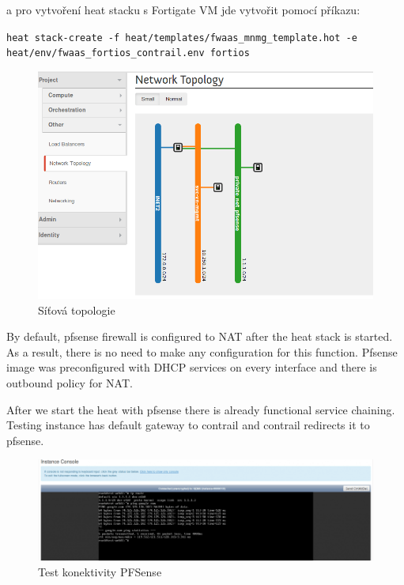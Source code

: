 a pro vytvoření heat stacku s Fortigate VM jde vytvořit pomocí příkazu:

\verb!heat stack-create -f heat/templates/fwaas_mnmg_template.hot -e heat/env/fwaas_fortios_contrail.env fortios!


\begin{figure}[h]
\begin{centering}
\includegraphics[scale=0.45]{images/fwaas_topologie}
\par\end{centering}
\caption{Síťová topologie\label{fig:fwaas_topologie}}
\end{figure}


By default, pfsense firewall is configured to NAT after the heat stack is started. As a result, there is no need to make any configuration for this function. Pfsense image was preconfigured with DHCP services on every interface and there is outbound policy for NAT.

After we start the heat with pfsense there is already functional service chaining. Testing instance has default gateway to contrail and contrail redirects it to pfsense.

\begin{figure}[h]
\begin{centering}
\includegraphics[scale=0.45]{images/pfsense_ping}
\par\end{centering}
\caption{Test konektivity PFSense\label{fig:pfsense_ping}}
\end{figure}

